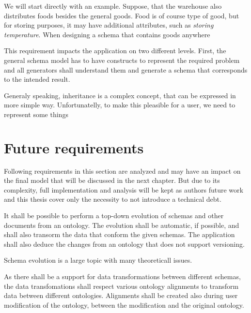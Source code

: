 \begin{showcase}
    We will start directly with an example. Suppose, that the warehouse also distributes foods besides the general goods. Food is of course type of good, but for storing purposes, it may have additional attributes, such as \textit{storing temperature}. When designing a schema that contains goods anywhere


\end{showcase}

This requirement impacts the application on two different levels. First, the general schema model has to have constructs to represent the required problem and all generators shall understand them and generate a schema that corresponds to the intended result.

Generaly speaking, inheritance is a complex concept, that can be expressed in more simple way. Unfortunatelly, to make this pleasible for a user, we need to represent some things %


\section{Future requirements}

Following requirements in this section are analyzed and may have an impact on the final model that will be discussed in the next chapter. But due to its complexity, full implementation and analysis will be kept as authors future work and this thesis cover only the necessity to not introduce a technical debt.

\begin{requirement}
    It shall be possible to perform a top-down evolution of schemas and other documents from an ontology. The evolution shall be automatic, if possible, and shall also transorm the data that conform the given schemas. The application shall also deduce the changes from an ontology that does not support versioning.
\end{requirement}

Schema evolution is a large topic with many theoreticall issues.




\begin{requirement}
    As there shall be a support for data transformations between different schemas, the data transfomations shall respect various ontology alignments to transform data between different ontologies. Alignments shall be created also during user modification of the ontology, between the modification and the original ontology.
\end{requirement}

